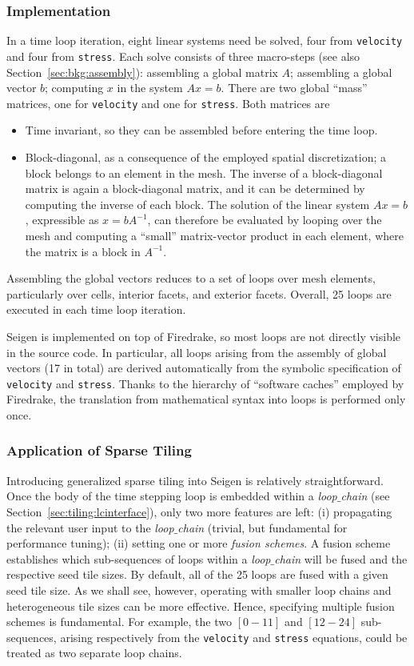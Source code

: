 \subsubsection{Implementation}
In a time loop iteration, eight linear systems need be solved, four from {\tt velocity} and four from {\tt stress}. Each solve consists of three macro-steps (see also Section~\ref{sec:bkg:assembly}): assembling a global matrix $A$; assembling a global vector $b$; computing $x$ in the system $Ax = b$. There are two global ``mass'' matrices, one for {\tt velocity} and one for {\tt stress}. Both matrices are
\begin{itemize}
\item Time invariant, so they can be assembled before entering the time loop.
\item Block-diagonal, as a consequence of the employed spatial discretization; a block belongs to an element in the mesh. The inverse of a block-diagonal matrix is again a block-diagonal matrix, and it can be determined by computing the inverse of each block. The solution of the linear system $Ax = b$, expressible as $x = b A^{-1}$, can therefore be evaluated by looping over the mesh and computing a ``small'' matrix-vector product in each element, where the matrix is a block in $A^{-1}$.
\end{itemize}
Assembling the global vectors reduces to a set of loops over mesh elements, particularly over cells, interior facets, and exterior facets. Overall, 25 loops are executed in each time loop iteration.

Seigen is implemented on top of Firedrake, so most loops are not directly visible in the source code. In particular, all loops arising from the assembly of global vectors (17 in total) are derived automatically from the symbolic specification of {\tt velocity} and {\tt stress}. Thanks to the hierarchy of ``software caches'' employed by Firedrake, the translation from mathematical syntax into loops is performed only once. 

\subsubsection{Application of Sparse Tiling}
Introducing generalized sparse tiling into Seigen is relatively straightforward. Once the body of the time stepping loop is embedded within a {\em loop$\_$chain} (see Section~\ref{sec:tiling:lcinterface}), only two more features are left: (i) propagating the relevant user input to the {\em loop$\_$chain} (trivial, but fundamental for performance tuning); (ii) setting one or more {\em fusion schemes}. A fusion scheme establishes which sub-sequences of loops within a {\em loop$\_$chain} will be fused and the respective seed tile sizes. By default, all of the 25 loops are fused with a given seed tile size. As we shall see, however, operating with smaller loop chains and heterogeneous tile sizes can be more effective. Hence, specifying multiple fusion schemes is fundamental. For example, the two $[0-11]$ and $[12-24]$ sub-sequences, arising respectively from the {\tt velocity} and {\tt stress} equations, could be treated as two separate loop chains. 

